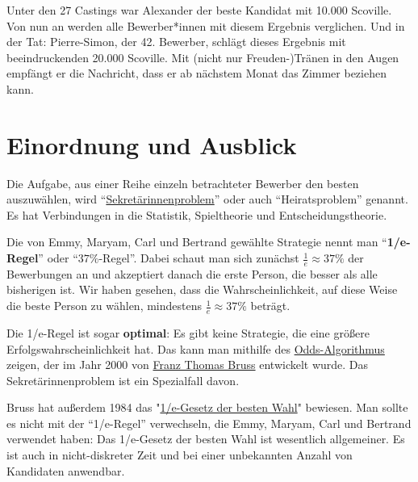 Unter den 27 Castings war Alexander der beste Kandidat mit 10.000 Scoville. Von nun an werden alle Bewerber*innen mit diesem Ergebnis verglichen. Und in der Tat: Pierre-Simon, der 42. Bewerber, schlägt dieses Ergebnis mit beeindruckenden 20.000 Scoville. Mit (nicht nur Freuden-)Tränen in den Augen empfängt er die Nachricht, dass er ab nächstem Monat das Zimmer beziehen kann.

\section{Einordnung und Ausblick}
Die Aufgabe, aus einer Reihe einzeln betrachteter Bewerber den besten auszuwählen, wird “\href{https://de.wikipedia.org/wiki/Sekret%C3%A4rinnenproblem}{Sekretärinnenproblem}” oder auch “Heiratsproblem” genannt. Es hat Verbindungen in die Statistik, Spieltheorie und Entscheidungstheorie.

Die von Emmy, Maryam, Carl und Bertrand gewählte Strategie nennt man “\textbf{1/e-Regel}” oder “$37\%$-Regel”. Dabei schaut man sich zunächst $\frac 1e\approx37\%$ der Bewerbungen an und akzeptiert danach die erste Person, die besser als alle bisherigen ist. Wir haben gesehen, dass die Wahrscheinlichkeit, auf diese Weise die beste Person zu wählen, mindestens $\frac1e\approx 37\%$ beträgt.

Die 1/e-Regel ist sogar \textbf{optimal}: Es gibt keine Strategie, die eine größere Erfolgswahrscheinlichkeit hat. Das kann man mithilfe des \href{https://de.wikipedia.org/wiki/Odds-Strategie}{Odds-Algorithmus} zeigen, der im Jahr 2000 von \href{https://en.wikipedia.org/wiki/Franz_Thomas_Bruss}{Franz Thomas Bruss} entwickelt wurde. Das Sekretärinnenproblem ist ein Spezialfall davon.

Bruss hat außerdem 1984 das "\href{https://de.wikipedia.org/wiki/Sekret%C3%A4rinnenproblem#1/e-Gesetz_der_besten_Wahl}{1/e-Gesetz der besten Wahl}" bewiesen. Man sollte es nicht mit der “1/e-Regel” verwechseln, die Emmy, Maryam, Carl und Bertrand verwendet haben: Das 1/e-Gesetz der besten Wahl ist wesentlich allgemeiner. Es ist auch in nicht-diskreter Zeit und bei einer unbekannten Anzahl von Kandidaten anwendbar.

